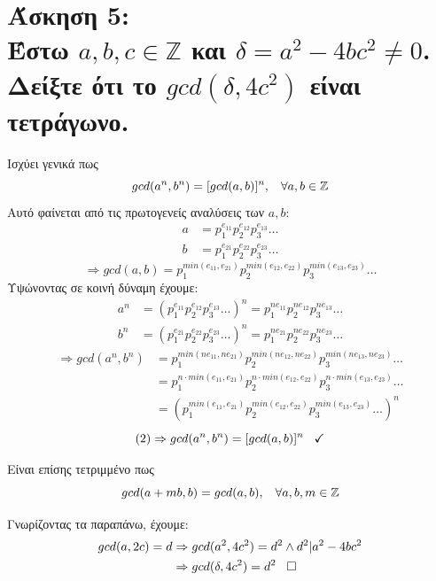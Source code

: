 \documentclass{article}
\newcommand{\blank}[1]{\hspace*{#1}}
\newcommand{\myspace}{\blank{0.3cm}}
\newcommand{\task}[2]{\newpage\section*{Άσκηση #1:\\#2}}
\begin{document}
\task{5}{
    Έστω $a,b,c\in\mathbb{Z}$ και $\delta = a^2 - 4bc^2 \not= 0$. Δείξτε ότι το $gcd(\delta, 4c^2)$ είναι τετράγωνο.
}
{
    Ισχύει γενικά πως
    \[gcd(a^n, b^n) = [gcd(a, b)]^n, \myspace \forall a,b\in\mathbb{Z}\]
    Αυτό φαίνεται από τις πρωτογενείς αναλύσεις των $a, b$:
    \begin{align*}
        a &= p_1^{e_{11}}p_2^{e_{12}}p_3^{e_{13}}\ldots\\
        b &= p_1^{e_{21}}p_2^{e_{22}}p_3^{e_{23}}\ldots
    \end{align*}
    \begin{equation}
        \Rightarrow gcd(a, b) = p_1^{min(e_{11}, e_{21})}p_2^{min(e_{12}, e_{22})}p_3^{min(e_{13}, e_{23})}\ldots
    \end{equation}
    Υψώνοντας σε κοινή δύναμη έχουμε:
    \begin{align*}
        a^n &= (p_1^{e_{11}}p_2^{e_{12}}p_3^{e_{13}}\ldots)^n
            = p_1^{ne_{11}}p_2^{ne_{12}}p_3^{ne_{13}}\ldots\\
        b^n &= (p_1^{e_{21}}p_2^{e_{22}}p_3^{e_{23}}\ldots)^n
            = p_1^{ne_{21}}p_2^{ne_{22}}p_3^{ne_{23}}\ldots
    \end{align*}
    \begin{align*}
        \Rightarrow gcd(a^n, b^n) &= p_1^{min(ne_{11}, ne_{21})}p_2^{min(ne_{12}, ne_{22})}p_3^{min(ne_{13}, ne_{23})}\ldots\\
            &= p_1^{n\cdot min(e_{11}, e_{21})}p_2^{n\cdot min(e_{12}, e_{22})}p_3^{n\cdot min(e_{13}, e_{23})}\ldots\\
            &= (p_1^{min(e_{11}, e_{21})}p_2^{min(e_{12}, e_{22})}p_3^{min(e_{13}, e_{23})}\ldots)^n
    \end{align*}
    \begin{equation*}
        (2)\Rightarrow gcd(a^n, b^n) = [gcd(a, b)]^n \myspace \checkmark
    \end{equation*}

    Είναι επίσης τετριμμένο πως 
    \[gcd(a + mb, b) = gcd(a, b), \myspace \forall a,b,m\in\mathbb{Z}\]
    
    Γνωρίζοντας τα παραπάνω, έχουμε:
    \begin{align*}
        gcd(a, 2c) = d &\Rightarrow gcd(a^2, 4c^2) = d^2 \land d^2 | a^2 - 4bc^2\\
        &\Rightarrow gcd(\delta, 4c^2) = d^2 \myspace \square
    \end{align*}
}
\end{document}
